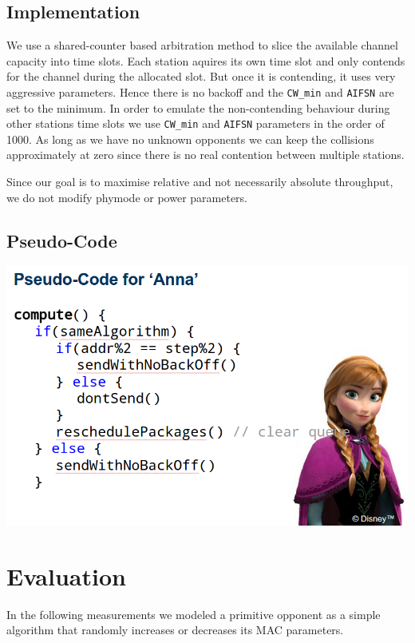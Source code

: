 \documentclass[12pt]{article}
\begin{document}
\subsection{Implementation}
We use a shared-counter based arbitration method to slice the available channel capacity into time slots. Each station aquires its own time slot and only contends for the channel during the allocated slot. But once it is contending, it uses very aggressive parameters. Hence there is no backoff and the \texttt{CW_min} and \texttt{AIFSN} are set to the minimum.
In order to emulate the non-contending behaviour during other stations time slots we use  \texttt{CW_min} and \texttt{AIFSN} parameters in the order of 1000. As long as we have no unknown opponents we can keep the collisions approximately at zero since there is no real contention between multiple stations.

Since our goal is to maximise relative and not necessarily absolute throughput, we do not  modify phymode or power parameters.

\subsection{Pseudo-Code}

\includegraphics[width=160mm]{img/pseudocode.png}



\section{Evaluation}
In the following measurements we modeled a primitive opponent as a simple algorithm that randomly increases or decreases its MAC parameters. 
\end{document}
